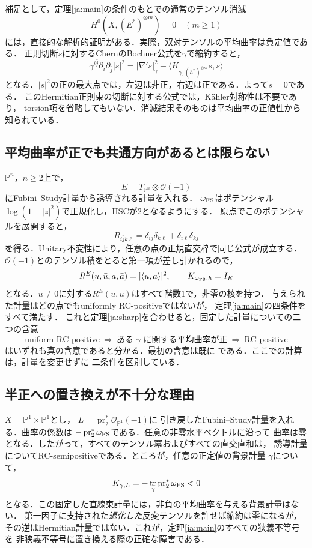 \documentclass[12pt]{amsart}
\theoremstyle{definition}
\theoremstyle{remark}
\numberwithin{equation}{section}
\DeclareMathOperator{\tr}{tr}
\theoremstyle{definition}
\begin{document}
補足として，定理\ref{ja:main}の条件のもとでの通常のテンソル消滅
\begin{equation}\label{ja:vanishing}
 H^0(X,(E^*)^{\otimes m})=0\quad(m\geq1)
\end{equation}
には，直接的な解析的証明がある．実際，双対テンソルの平均曲率は負定値である．
正則切断$s$に対するChernのBochner公式を$\gamma$で縮約すると，
\[
 \gamma^{i\bar j}\partial_i\partial_{\bar j}|s|^2
 =|\nabla' s|_\gamma^2-\langle K_{\gamma,(h^*)^{\otimes m}}s,s\rangle
\]
となる．$|s|^2$の正の最大点では，左辺は非正，右辺は正である．よって$s=0$である．
このHermitian正則束の切断に対する公式では，K\"ahler対称性は不要であり，
torsion項を省略してもいない．消滅結果そのものは平均曲率の正値性から知られている．

\subsection{平均曲率が正でも共通方向があるとは限らない}
$\mathbb P^n$，$n\geq2$上で，
\[
 E=T_{\mathbb P^n}\otimes\mathcal O(-1)
\]
にFubini--Study計量から誘導される計量を入れる．
$\omega_{\rm FS}$はポテンシャル$\log(1+|z|^2)$で正規化し，HSCが$2$となるようにする．
原点でこのポテンシャルを展開すると，
\[
 R_{i\bar j k\bar\ell}
 =\delta_{ij}\delta_{k\ell}+\delta_{i\ell}\delta_{kj}
\]
を得る．Unitary不変性により，任意の点の正規直交枠で同じ公式が成立する．
$\mathcal O(-1)$とのテンソル積をとると第一項が差し引かれるので，
\[
 R^E(u,\bar u,a,\bar a)=|\langle u,a\rangle|^2,
 \qquad K_{\omega_{\rm FS},h}=I_E
\]
となる．$u\ne0$に対する$R^E(u,\bar u)$はすべて階数$1$で，非零の核を持つ．
与えられた計量はどの点でもuniformly RC-positiveではないが，
定理\ref{ja:main}の四条件をすべて満たす．
これと定理\ref{ja:sharp}を合わせると，固定した計量についての二つの含意
\[
 \text{uniform RC-positive}
 \ \Longrightarrow\ \text{ある }\gamma\text{ に関する平均曲率が正}
 \ \Longrightarrow\ \text{RC-positive}
\]
はいずれも真の含意であると分かる．最初の含意は既に
\cite[Proposition 3.6]{ja:LZZ}である．ここでの計算は，計量を変更せずに
二条件を区別している．

\subsection{半正への置き換えが不十分な理由}
$X=\mathbb P^1\times\mathbb P^1$とし，
$L=\operatorname{pr}_2^*\mathcal O_{\mathbb P^1}(-1)$に
引き戻したFubini--Study計量を入れる．曲率の係数は
$-\operatorname{pr}_2^*\omega_{\rm FS}$である．任意の非零水平ベクトルに沿って
曲率は零となる．したがって，すべてのテンソル冪およびすべての直交直和は，
誘導計量についてRC-semipositiveである．ところが，任意の正定値の背景計量
$\gamma$について，
\[
 K_{\gamma,L}=-\tr_\gamma\operatorname{pr}_2^*\omega_{\rm FS}<0
\]
となる．この固定した直線束計量には，非負の平均曲率を与える背景計量はない．
第一因子に支持された\emph{退化した}反変テンソルを許せば縮約は零になるが，
その逆はHermitian計量ではない．これが，定理\ref{ja:main}のすべての狭義不等号を
非狭義不等号に置き換える際の正確な障害である．
\end{document}

